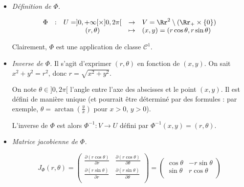 \documentclass[11pt, class=report,crop=false]{standalone}
\begin{document}
\begin{itemize}
    \item \emph{Définition de $\Phi$.}

$$\begin{array}{ccccl}\Phi &:&U=]0,+\infty [\times ]0,2\pi [
&\to&V=\Rr^2\setminus \left(\Rr_+\times\{0\}\right)\\
&&(r,\theta)&\mapsto &(x,y)=(r\cos\theta, r \sin\theta)
\end{array}$$
  
Clairement, $\Phi$ est une application de classe $\mathcal{C}^1$.
   
\begin{center} 
\begin{minipage}{0.3\textwidth}      
\end{minipage}\qquad\qquad
\begin{minipage}{0.55\textwidth}  
\end{minipage}  
\end{center}
   
  \item \emph{Inverse de $\Phi$.}    
  Il s'agit d'exprimer $(r,\theta)$ en fonction de $(x,y)$.
  On sait $x^2+y^2 = r^2$, donc $r = \sqrt{x^2+y^2}$.
  
  On note $\theta \in ]0,2\pi[$ l'angle  entre l'axe des abscisses et le point $(x,y)$. Il est défini de manière unique (et pourrait être déterminé par des formules : par exemple, $\theta = \arctan(\frac y x)$ pour $x>0$, $y>0$).
  
  L'inverse de $\Phi$ est alors $\Phi^{-1} : V \to U$ défini par 
  $\Phi^{-1}(x,y) = (r,\theta)$.
  
  \item \emph{Matrice jacobienne de $\Phi$.}

$$J_\Phi(r,\theta)
= 
\begin{pmatrix}\frac{\partial (r\cos\theta)}{\partial r} & \frac{\partial (r\cos\theta)}{\partial \theta} \\
\frac{\partial (r\sin\theta)}{\partial r} & \frac{\partial (r\sin\theta)}{\partial \theta} \\
\end{pmatrix}
= 
\begin{pmatrix}
\cos \theta &-r\sin \theta \\
\sin \theta &r\cos \theta \\
\end{pmatrix}$$
  

\end{itemize}
\end{document}
